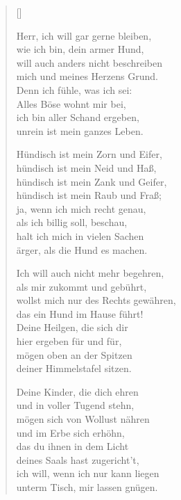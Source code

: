 \begin{multicols}{2}
\settowidth{\versewidth}{Herr, ich will gar gerne bleiben,}
\begin{verse}[\versewidth]

 Herr, ich will gar gerne bleiben,\\
wie ich bin, dein armer Hund,\\
will auch anders nicht beschreiben\\
mich und meines Herzens Grund.\\
Denn ich fühle, was ich sei:\\
Alles Böse wohnt mir bei,\\
ich bin aller Schand ergeben,\\
unrein ist mein ganzes Leben.

 Hündisch ist mein Zorn und Eifer,\\
hündisch ist mein Neid und Haß,\\
hündisch ist mein Zank und Geifer,\\
hündisch ist mein Raub und Fraß;\\
ja, wenn ich mich recht genau,\\
als ich billig soll, beschau,\\
halt ich mich in vielen Sachen\\
ärger, als die Hund es machen.

 Ich will auch nicht mehr begehren,\\
als mir zukommt und gebührt,\\
wollst mich nur des Rechts gewähren,\\
das ein Hund im Hause führt!\\
Deine Heilgen, die sich dir\\
hier ergeben für und für,\\
mögen oben an der Spitzen\\
deiner Himmelstafel sitzen.

 Deine Kinder, die dich ehren\\
und in voller Tugend stehn,\\
mögen sich von Wollust nähren\\
und im Erbe sich erhöhn,\\
das du ihnen in dem Licht\\
deines Saals hast zugericht't,\\
ich will, wenn ich nur kann liegen\\
unterm Tisch, mir lassen gnügen.


\end{verse}
\end{multicols}
